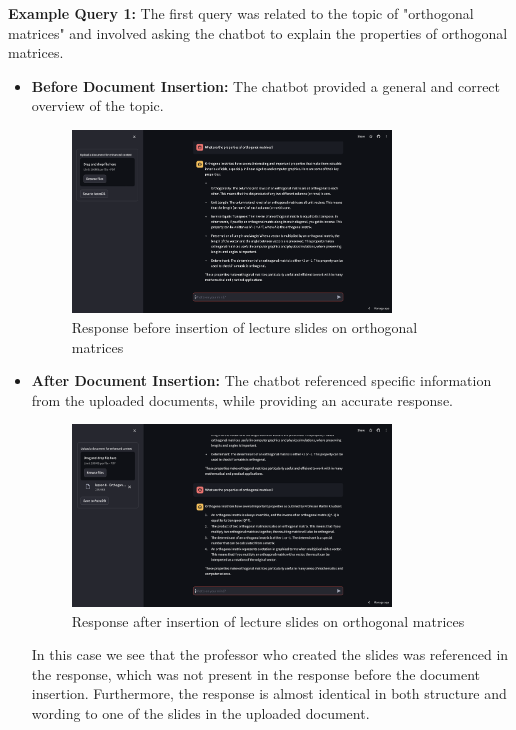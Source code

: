 \textbf{Example Query 1:}
The first query was related to the topic of "orthogonal matrices" and involved asking the chatbot to explain the properties of orthogonal matrices.
\begin{itemize}
    \item \textbf{Before Document Insertion:} The chatbot provided a general and correct overview of the topic.
    \begin{figure}[H]
        \centering
        \includegraphics[width=0.8\textwidth]{figs/BeforeOrthogonal.png}
        \caption{Response before insertion of lecture slides on orthogonal matrices}
        \label{fig:before_orthogonal_matrices}
    \end{figure}
    \item \textbf{After Document Insertion:} The chatbot referenced specific information from the uploaded documents, while providing an accurate response.
    \begin{figure}[H]
        \centering
        \includegraphics[width=0.8\textwidth]{figs/AfterOrthogonal.png}
        \caption{Response after insertion of lecture slides on orthogonal matrices}
        \label{fig:after_orthogonal_matrices}
    \end{figure}
    In this case we see that the professor who created the slides was referenced in the response, which was not present in the response before the document insertion. Furthermore, the response is almost identical in both structure and wording to one of the slides in the uploaded document.
\end{itemize}

